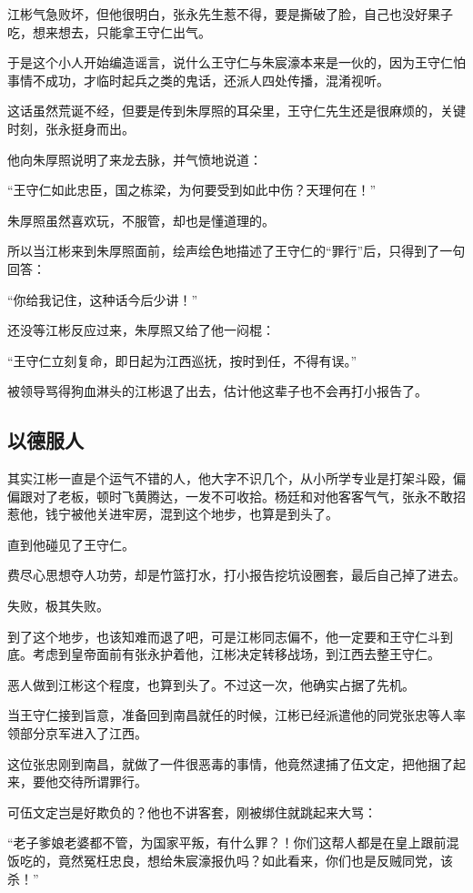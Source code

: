 \begin{multicols}{\theparacolNo}
江彬气急败坏，但他很明白，张永先生惹不得，要是撕破了脸，自己也没好果子吃，想来想去，只能拿王守仁出气。

于是这个小人开始编造谣言，说什么王守仁与朱宸濠本来是一伙的，因为王守仁怕事情不成功，才临时起兵之类的鬼话，还派人四处传播，混淆视听。

这话虽然荒诞不经，但要是传到朱厚照的耳朵里，王守仁先生还是很麻烦的，关键时刻，张永挺身而出。

他向朱厚照说明了来龙去脉，并气愤地说道：

“王守仁如此忠臣，国之栋梁，为何要受到如此中伤？天理何在！”

朱厚照虽然喜欢玩，不服管，却也是懂道理的。

所以当江彬来到朱厚照面前，绘声绘色地描述了王守仁的“罪行”后，只得到了一句回答：

“你给我记住，这种话今后少讲！”

还没等江彬反应过来，朱厚照又给了他一闷棍：

“王守仁立刻复命，即日起为江西巡抚，按时到任，不得有误。”

被领导骂得狗血淋头的江彬退了出去，估计他这辈子也不会再打小报告了。

\subsection{以德服人}
其实江彬一直是个运气不错的人，他大字不识几个，从小所学专业是打架斗殴，偏偏跟对了老板，顿时飞黄腾达，一发不可收拾。杨廷和对他客客气气，张永不敢招惹他，钱宁被他关进牢房，混到这个地步，也算是到头了。

直到他碰见了王守仁。

费尽心思想夺人功劳，却是竹篮打水，打小报告挖坑设圈套，最后自己掉了进去。

失败，极其失败。

到了这个地步，也该知难而退了吧，可是江彬同志偏不，他一定要和王守仁斗到底。考虑到皇帝面前有张永护着他，江彬决定转移战场，到江西去整王守仁。

恶人做到江彬这个程度，也算到头了。不过这一次，他确实占据了先机。

当王守仁接到旨意，准备回到南昌就任的时候，江彬已经派遣他的同党张忠等人率领部分京军进入了江西。

这位张忠刚到南昌，就做了一件很恶毒的事情，他竟然逮捕了伍文定，把他捆了起来，要他交待所谓罪行。

可伍文定岂是好欺负的？他也不讲客套，刚被绑住就跳起来大骂：

“老子爹娘老婆都不管，为国家平叛，有什么罪？！你们这帮人都是在皇上跟前混饭吃的，竟然冤枉忠良，想给朱宸濠报仇吗？如此看来，你们也是反贼同党，该杀！”


\end{multicols}

